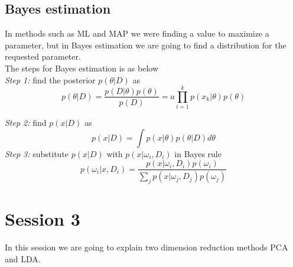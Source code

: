 \documentclass{article}
\begin{document}
\subsection{Bayes estimation}
In methods such as ML and MAP we were finding a value to maximize a parameter, but in Bayes estimation we are going to find a distribution for the requested parameter. \\
The steps for Bayes estimation is as below \\
\textit{Step 1:} find the posterior $p(\theta | D)$ as
\begin{equation}
    p(\theta | D) = \frac{p(D|\theta) p(\theta)}{p(D)} = a \prod_{i=1}^{k}p(x_k | \theta) p(\theta)
\end{equation}

\textit{Step 2:} find $p(x | D)$ as
\begin{equation}
    p(x|D) = \int p(x|\theta) p(\theta | D) d\theta
\end{equation}
\textit{Step 3:} substitute $p(x | D)$ with $p(x|\omega_i, D_i)$ in Bayes rule
\begin{equation}
    p(\omega_i| x,D_i) = \frac{p(x|\omega_i, D_i) p(\omega_i)}{ \sum_{j} p(x|\omega_j, D_j) p(\omega_j) }
\end{equation}

\section{Session 3}
In this session we are going to explain two dimension reduction methods PCA and LDA.
\end{document}
